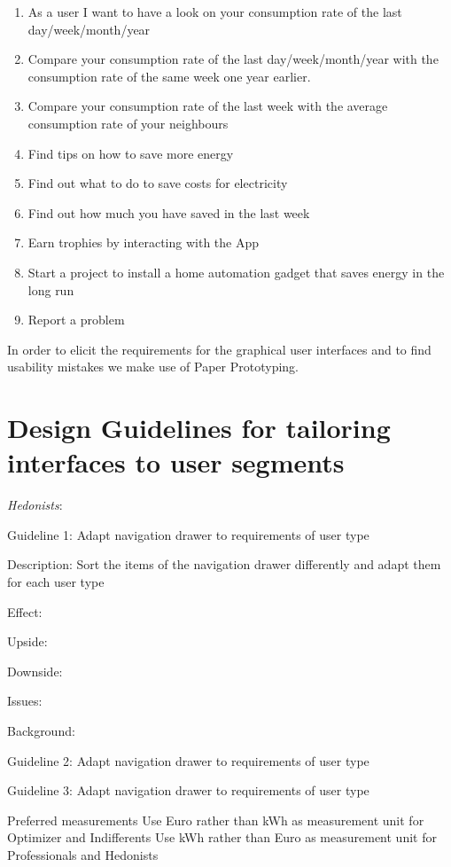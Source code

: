 	\begin{enumerate}
		\item As a user I want to have a look on your consumption rate of the last day/week/month/year
		\item Compare your consumption rate of the last day/week/month/year with the consumption rate of the same week one year earlier.
		\item Compare your consumption rate of the last week with the average consumption rate of your neighbours
		\item Find tips on how to save more energy
		\item Find out what to do to save costs for electricity
		\item Find out how much you have saved in the last week
		\item Earn trophies by interacting with the App
		\item Start a project to install a home automation gadget that saves energy in the long run
		\item Report a problem
	\end{enumerate}
	
	
	
In order to elicit the requirements for the graphical user interfaces and to find usability mistakes we make use of Paper Prototyping. 



\section{Design Guidelines for tailoring interfaces to user segments}


\textit{Hedonists}:


Guideline 1: Adapt navigation drawer to requirements of user type

Description: Sort the items of the navigation drawer differently and adapt them for each user type

Effect:

Upside:

Downside:

Issues:

Background:

Guideline 2: Adapt navigation drawer to requirements of user type

Guideline 3: Adapt navigation drawer to requirements of user type

Preferred measurements
	Use Euro rather than kWh as measurement unit for Optimizer and Indifferents
	Use kWh rather than Euro as measurement unit for Professionals and Hedonists


